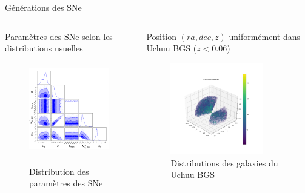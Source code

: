 \documentclass{beamer}
\begin{document}
\begin{frame}{Générations des SNe}
\begin{columns}
\begin{column}{.5\textwidth}
Paramètres des SNe selon les distributions usuelles
\begin{figure}
	\centering
	{\includegraphics[height=4cm]{figures/SNe_sampling.png}}
	\caption{Distribution des paramètres des SNe}
\end{figure}
\end{column}

\begin{column}{.5\textwidth}
Position $(ra, dec, z)$ uniformément dans Uchuu BGS ($z < 0.06$)
\begin{figure}
	\centering
	\includegraphics[height=4cm, trim={3cm 5cm 55mm 6cm}, clip]{figures/Uchuu.png}
	\caption{Distributions des galaxies du Uchuu BGS}
\end{figure}
\end{column}
\end{columns}
\end{frame}
\end{document}
